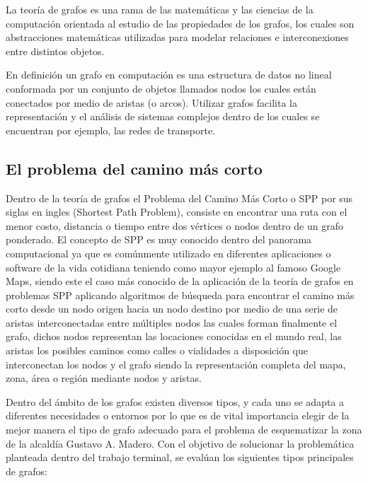 La teoría de grafos es una rama de las matemáticas y las ciencias de la computación orientada al estudio de las propiedades de los grafos, los cuales son abstracciones matemáticas utilizadas para modelar relaciones e interconexiones entre distintos objetos.

En definición un grafo en computación es una estructura de datos no lineal conformada por un conjunto de objetos llamados nodos los cuales están conectados por medio de aristas (o arcos). Utilizar grafos facilita la representación y el análisis de sistemas complejos dentro de los cuales se encuentran por ejemplo, las redes de transporte. 

\subsection{El problema del camino más corto}

Dentro de la teoría de grafos el Problema del Camino Más Corto o SPP por sus siglas en ingles (Shortest Path Problem), consiste en encontrar una ruta con el menor costo, distancia o tiempo entre dos vértices o nodos dentro de un grafo ponderado. El concepto de SPP es muy conocido dentro del panorama computacional ya que es comúnmente utilizado en diferentes aplicaciones o software de la vida cotidiana teniendo como mayor ejemplo al famoso Google Maps, siendo este el caso más conocido de la aplicación de la teoría de grafos en problemas SPP aplicando algoritmos de búsqueda para encontrar el camino más corto desde un nodo origen hacia un nodo destino por medio de una serie de aristas interconectadas entre múltiples nodos las cuales forman finalmente el grafo, dichos nodos representan las locaciones conocidas en el mundo real, las aristas los posibles caminos como calles o vialidades a disposición que interconectan los nodos y el grafo siendo la representación completa del mapa, zona, área o región mediante nodos y aristas. 

Dentro del ámbito de los grafos existen diversos tipos, y cada uno se adapta a diferentes necesidades o entornos por lo que es de vital importancia elegir de la mejor manera el tipo de grafo adecuado para el problema de esquematizar la zona de la alcaldía Gustavo A. Madero. Con el objetivo de solucionar la problemática planteada dentro del trabajo terminal, se evalúan los siguientes tipos principales de grafos:

\newpage

